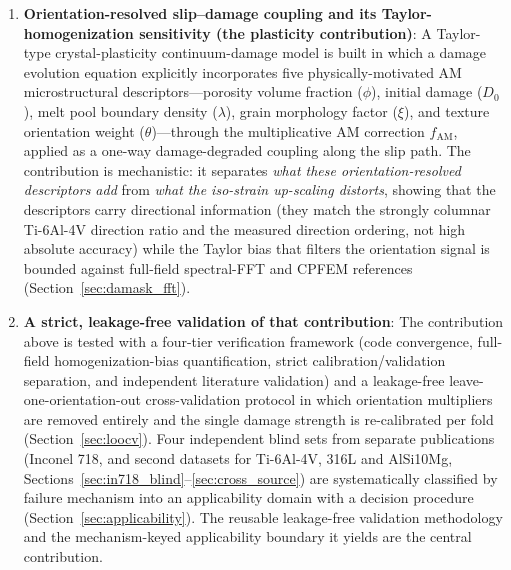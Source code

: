 \documentclass[twocolumn]{sagej}
\begin{document}
\begin{enumerate}\def\labelenumi{(\arabic{enumi})}
    \item \textbf{Orientation-resolved slip--damage coupling and its Taylor-homogenization sensitivity (the plasticity contribution)}: A Taylor-type crystal-plasticity continuum-damage model is built in which a damage evolution equation explicitly incorporates five physically-motivated AM microstructural descriptors---porosity volume fraction ($\phi$), initial damage ($D_0$), melt pool boundary density ($\lambda$), grain morphology factor ($\xi$), and texture orientation weight ($\theta$)---through the multiplicative AM correction $f_{\text{AM}}$, applied as a one-way damage-degraded coupling along the slip path. The contribution is mechanistic: it separates \emph{what these orientation-resolved descriptors add} from \emph{what the iso-strain up-scaling distorts}, showing that the descriptors carry directional information (they match the strongly columnar Ti-6Al-4V direction ratio and the measured direction ordering, not high absolute accuracy) while the Taylor bias that filters the orientation signal is bounded against full-field spectral-FFT and CPFEM references (Section~\ref{sec:damask_fft}).
    
    \item \textbf{A strict, leakage-free validation of that contribution}: The contribution above is tested with a four-tier verification framework (code convergence, full-field homogenization-bias quantification, strict calibration/validation separation, and independent literature validation) and a leakage-free leave-one-orientation-out cross-validation protocol in which orientation multipliers are removed entirely and the single damage strength is re-calibrated per fold (Section~\ref{sec:loocv}). Four independent blind sets from separate publications (Inconel 718, and second datasets for Ti-6Al-4V, 316L and AlSi10Mg, Sections~\ref{sec:in718_blind}--\ref{sec:cross_source}) are systematically classified by failure mechanism into an applicability domain with a decision procedure (Section~\ref{sec:applicability}). The reusable leakage-free validation methodology and the mechanism-keyed applicability boundary it yields are the central contribution.
    

\end{enumerate}
\end{document}
